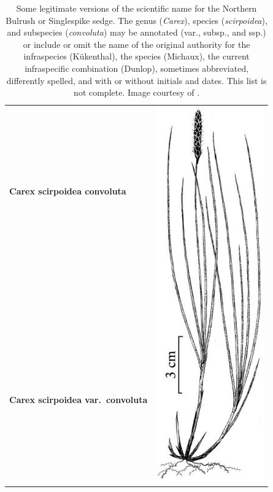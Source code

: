 \documentclass{bmcart}
\begin{document}
\begin{table}[!htb]
  \begin{center}

  \caption{Some legitimate versions of the scientific name for the Northern
    Bulrush or Singlespike sedge.  The genus (\textit{Carex}), species
    (\textit{scirpoidea}), and subspecies (\textit{convoluta}) may be annotated
    (var., subsp., and ssp.) or include or omit the name of the original
    authority for the infraspecies (Kükenthal), the species (Michaux), the
    current infraspecific combination (Dunlop), sometimes abbreviated,
    differently spelled, and with or without initials and dates. This list is
    not complete.  Image courtesy of \cite{FNA2002}.}\label{table:carex}

    \begin{tabular}{| l | c |}
    \hline
    \textbf{Carex scirpoidea convoluta} &
    \multirow{26}{*}{\includegraphics[scale=0.3]{images/1.png}} \\
    & \\
    \textbf{Carex scirpoidea var.\ convoluta} & \\

\end{tabular}
\end{center}
\end{table}
\end{document}
